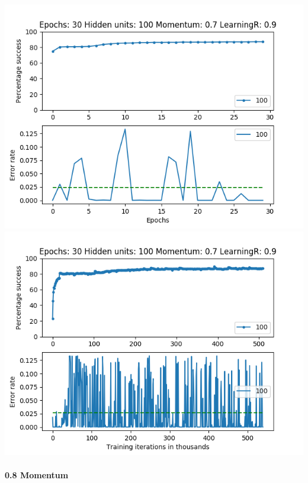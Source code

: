 \documentclass[11pt]{article}
\makeatletter
\def\maxwidth{\ifdim\Gin@nat@width>\linewidth\linewidth
    \else\Gin@nat@width\fi}
\let\Oldincludegraphics\includegraphics
\renewcommand{\includegraphics}[1]{\Oldincludegraphics[width=.8\maxwidth]{#1}}
\makeatother
\begin{document}
\includegraphics{Experiment2/E2_NN_Epoch_Momentum_0.7_30Epochs_100Hiddenunits.png}
\includegraphics{Experiment2/E2_NN_Training_Momentum_0.7_30Epochs_100Hiddenunits.png}

\hypertarget{momentum-8}{%
\paragraph{0.8 Momentum}\label{momentum-8}}
\end{document}
